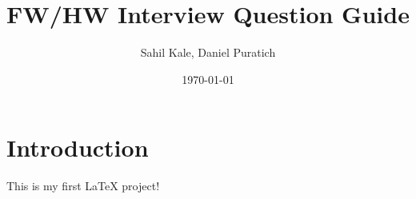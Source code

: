 \documentclass[letterpaper,12pt]{article}
\title{FW/HW Interview Question Guide}
\author{Sahil Kale, Daniel Puratich}
\date{\today}
\begin{document}
\maketitle

\section{Introduction}
This is my first LaTeX project!


\end{document}

